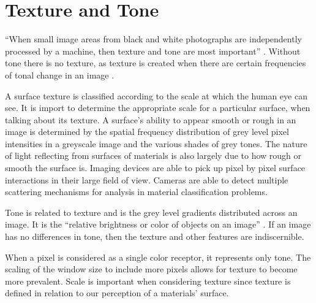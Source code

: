 \section{Texture and Tone}

“When small image areas from black and white photographs are independently processed by a machine, then texture and tone are most important” \cite{haralick}.  Without tone there is no texture, as texture is created when there are certain frequencies of tonal change in an image \cite{remotesensing}.

A surface texture is classified according to the scale at which the human eye can see.  It is import to determine the appropriate scale for a particular surface, when talking about its texture.  A surface's ability to appear smooth or rough in an image is determined by the spatial frequency distribution of grey level pixel intensities in a greyscale image and the various shades of grey tones.  The nature of light reflecting from surfaces of materials is also largely due to how rough or smooth the surface is.  Imaging devices are able to pick up pixel by pixel surface interactions in their large field of view.  Cameras are able to detect multiple scattering mechanisms for analysis in material classification problems.

Tone is related to texture and is the grey level gradients distributed across an image.  It is the “relative brightness or color of objects on an image” \cite{remotesensing}.  If an image has no differences in tone, then the texture and other features are indiscernible.

When a pixel is considered as a single color receptor, it represents only tone.  The scaling of the window size to include more pixels allows for texture to become more prevalent.   Scale is important when considering texture since texture is defined in relation to our perception of a materials' surface.



